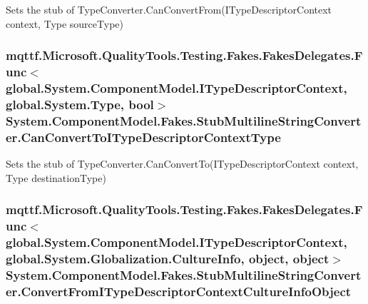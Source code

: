 Sets the stub of Type\-Converter.\-Can\-Convert\-From(\-I\-Type\-Descriptor\-Context context, Type source\-Type)

\hypertarget{class_system_1_1_component_model_1_1_fakes_1_1_stub_multiline_string_converter_abd5a87a438eb1fc4914bfce2ffaf7b88}{
\subsubsection[{Can\-Convert\-To\-I\-Type\-Descriptor\-Context\-Type}]{\setlength{\rightskip}{0pt plus 5cm}mqttf.\-Microsoft.\-Quality\-Tools.\-Testing.\-Fakes.\-Fakes\-Delegates.\-Func$<$global.\-System.\-Component\-Model.\-I\-Type\-Descriptor\-Context, global.\-System.\-Type, bool$>$ System.\-Component\-Model.\-Fakes.\-Stub\-Multiline\-String\-Converter.\-Can\-Convert\-To\-I\-Type\-Descriptor\-Context\-Type}}\label{class_system_1_1_component_model_1_1_fakes_1_1_stub_multiline_string_converter_abd5a87a438eb1fc4914bfce2ffaf7b88}


Sets the stub of Type\-Converter.\-Can\-Convert\-To(\-I\-Type\-Descriptor\-Context context, Type destination\-Type)

\hypertarget{class_system_1_1_component_model_1_1_fakes_1_1_stub_multiline_string_converter_ae83f0bf2b2a0e7957abea151d62ca514}{
\subsubsection[{Convert\-From\-I\-Type\-Descriptor\-Context\-Culture\-Info\-Object}]{\setlength{\rightskip}{0pt plus 5cm}mqttf.\-Microsoft.\-Quality\-Tools.\-Testing.\-Fakes.\-Fakes\-Delegates.\-Func$<$global.\-System.\-Component\-Model.\-I\-Type\-Descriptor\-Context, global.\-System.\-Globalization.\-Culture\-Info, object, object$>$ System.\-Component\-Model.\-Fakes.\-Stub\-Multiline\-String\-Converter.\-Convert\-From\-I\-Type\-Descriptor\-Context\-Culture\-Info\-Object}}\label{class_system_1_1_component_model_1_1_fakes_1_1_stub_multiline_string_converter_ae83f0bf2b2a0e7957abea151d62ca514}



